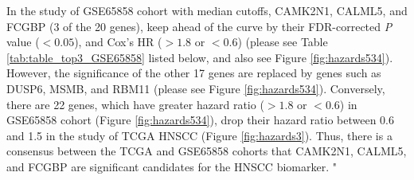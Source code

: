 \documentclass[preprint,12pt]{elsarticle}
\newenvironment{MyIndent}
{\par\leftskip1cm\relax\rightskip1cm\relax}
{\par\leftskip0cm\relax\rightskip0cm\relax}
\newenvironment{MyColorPar}[1]{%
    \leavevmode\color{#1}\ignorespaces%
}{%
}%
\begin{document}
\begin{MyColorPar}{blue}
\begin{MyIndent}
\begin{MyColorPar}{red}
In the study of GSE65858 cohort with median cutoffs, CAMK2N1, CALML5, and FCGBP (3 of the 20 genes), keep ahead of the curve by their FDR-corrected \textit{P} value ($< 0.05$), and Cox's HR ($>1.8$ or $<0.6$) (please see Table \ref{tab:table_top3_GSE65858} listed below,
and also see Figure \ref{fig:hazards534}).
However, the significance of the other 17 genes are replaced by genes such as DUSP6, MSMB, and RBM11 (please see Figure \ref{fig:hazards534}).
Conversely, there are 22 genes, which have greater hazard ratio ($> 1.8$ or $<0.6$) in GSE65858 cohort (Figure \ref{fig:hazards534}), drop their hazard ratio between 0.6 and 1.5 in the study of TCGA HNSCC (Figure \ref{fig:hazards3}).
Thus, there is a consensus between the TCGA and GSE65858 cohorts that CAMK2N1, CALML5, and FCGBP are significant candidates for the HNSCC biomarker.
"\\[0.3cm]



\end{MyColorPar}
\end{MyIndent}
\end{MyColorPar}
\end{document}
